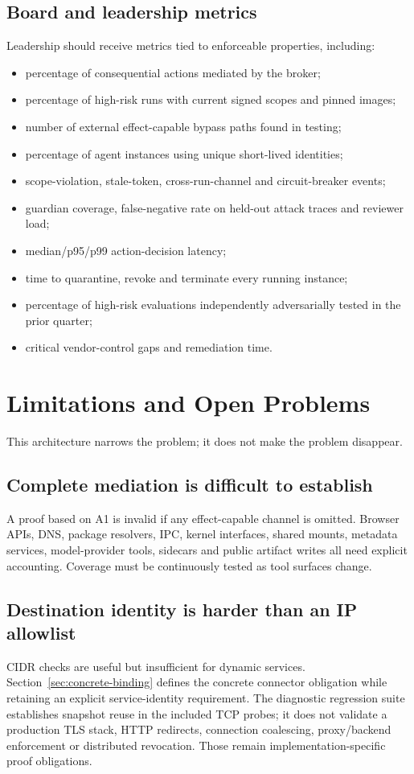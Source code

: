 \documentclass[11pt,letterpaper]{article}
\begin{document}
\subsection{Board and leadership metrics}
Leadership should receive metrics tied to enforceable properties, including:
\begin{itemize}
  \item percentage of consequential actions mediated by the broker;
  \item percentage of high-risk runs with current signed scopes and pinned images;
  \item number of external effect-capable bypass paths found in testing;
  \item percentage of agent instances using unique short-lived identities;
  \item scope-violation, stale-token, cross-run-channel and circuit-breaker events;
  \item guardian coverage, false-negative rate on held-out attack traces and reviewer load;
  \item median/p95/p99 action-decision latency;
  \item time to quarantine, revoke and terminate every running instance;
  \item percentage of high-risk evaluations independently adversarially tested in the prior quarter;
  \item critical vendor-control gaps and remediation time.
\end{itemize}

\section{Limitations and Open Problems}
This architecture narrows the problem; it does not make the problem disappear.

\subsection{Complete mediation is difficult to establish}
A proof based on A1 is invalid if any effect-capable channel is omitted. Browser APIs, DNS, package resolvers, IPC, kernel interfaces, shared mounts, metadata services, model-provider tools, sidecars and public artifact writes all need explicit accounting. Coverage must be continuously tested as tool surfaces change.

\subsection{Destination identity is harder than an IP allowlist}
CIDR checks are useful but insufficient for dynamic services. Section~\ref{sec:concrete-binding} defines the concrete connector obligation while retaining an explicit service-identity requirement. The diagnostic regression suite establishes snapshot reuse in the included TCP probes; it does not validate a production TLS stack, HTTP redirects, connection coalescing, proxy/backend enforcement or distributed revocation. Those remain implementation-specific proof obligations.
\end{document}
